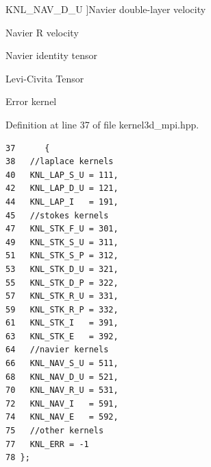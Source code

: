\begin{Desc}
\begin{description}
{KNL\_\-NAV\_\-D\_\-U\label{kernel3d__mpi_8hpp_dca29a1140aadadfd92b34a02fa516ef_dca29a1140aadadfd92b34a02fa516efd457410012ac8beed3aeade8210fe0ee}
}]Navier double-layer velocity \item[{\em 
KNL\_\-NAV\_\-R\_\-U\label{kernel3d__mpi_8hpp_dca29a1140aadadfd92b34a02fa516ef_dca29a1140aadadfd92b34a02fa516ef8ef849072cf27f330f7ad300b2e13271}
}]Navier R velocity \item[{\em 
KNL\_\-NAV\_\-I\label{kernel3d__mpi_8hpp_dca29a1140aadadfd92b34a02fa516ef_dca29a1140aadadfd92b34a02fa516ef7d4de896bcf3f6debcd1adb0ac4f691b}
}]Navier identity tensor \item[{\em 
KNL\_\-NAV\_\-E\label{kernel3d__mpi_8hpp_dca29a1140aadadfd92b34a02fa516ef_dca29a1140aadadfd92b34a02fa516efac275ece4177c1ebe9345a6c375eae03}
}]Levi-Civita Tensor \item[{\em 
KNL\_\-ERR\label{kernel3d__mpi_8hpp_dca29a1140aadadfd92b34a02fa516ef_dca29a1140aadadfd92b34a02fa516eff69da8fa2184937798545b1a072caebc}
}]Error kernel \end{description}
\end{Desc}



Definition at line 37 of file kernel3d\_\-mpi.hpp.

\footnotesize\begin{verbatim}37      {
38   //laplace kernels
40   KNL_LAP_S_U = 111,
42   KNL_LAP_D_U = 121,
44   KNL_LAP_I   = 191, 
45   //stokes kernels
47   KNL_STK_F_U = 301,
49   KNL_STK_S_U = 311,
51   KNL_STK_S_P = 312,
53   KNL_STK_D_U = 321,
55   KNL_STK_D_P = 322,
57   KNL_STK_R_U = 331,
59   KNL_STK_R_P = 332,
61   KNL_STK_I   = 391,
63   KNL_STK_E   = 392, 
64   //navier kernels
66   KNL_NAV_S_U = 511,
68   KNL_NAV_D_U = 521,
70   KNL_NAV_R_U = 531,
72   KNL_NAV_I   = 591,
74   KNL_NAV_E   = 592, 
75   //other kernels
77   KNL_ERR = -1
78 };
\end{verbatim}\normalsize 




